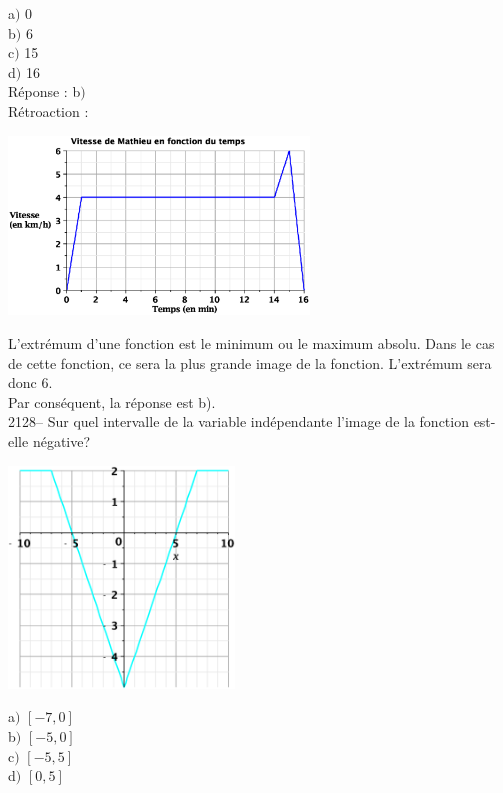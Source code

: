 \documentclass[letterpaper, 12pt]{article}
\begin{document}
a$)$ 0\\
b$)$ 6\\
c$)$ 15\\
d$)$ 16\\

R\'eponse : b$)$\\

R\'etroaction :\\
\begin{center}
 \includegraphics[width=8cm,bb=20 209 575 582]{Q2127.eps}
\end{center}
L'extr\'emum d'une fonction est le minimum ou le maximum absolu. Dans le cas de cette fonction, ce sera la plus grande image de la fonction. L'extr\'emum sera donc 6. \\
Par cons\'equent, la r\'eponse est b).\\

2128-- Sur quel intervalle de la variable ind\'ependante l'image de la fonction est-elle n\'egative? \\
\begin{center}
 \includegraphics[width=6cm,bb=20 118 575 673]{Q2128.eps}
\end{center}

a$)$  $[-7,0]$\\
b$)$  $[-5,0]$\\
c$)$  $[-5,5]$\\
d$)$  $[0,5]$\\
\end{document}
